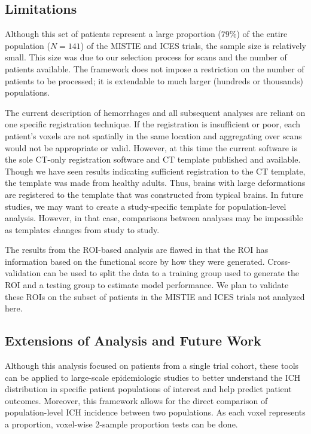 \documentclass[10pt]{article}\usepackage[]{graphicx}\usepackage[]{color}
\begin{document}
\subsection*{Limitations}

Although this set of patients represent a large proportion ($79$\%) of the entire population ($N=141$) of the MISTIE and ICES trials, the sample size is relatively small.  This size was due to our selection process for scans and the number of patients available.  The framework does not impose a restriction on the number of patients to be processed; it is extendable to much larger (hundreds or thousands) populations.

The current description of hemorrhages and all subsequent analyses are reliant on one specific registration technique.  If the registration is insufficient or poor, each patient's voxels are not spatially in the same location and aggregating over scans would not be appropriate or valid.  However, at this time the current software is the sole CT-only registration software and CT template published and available.  Though we have seen results indicating sufficient registration to the CT template, the template was made from healthy adults.  Thus, brains with large deformations are registered to the template that was constructed from typical brains. In future studies, we may want to create a study-specific template for population-level analysis.  However, in that case, comparisons between analyses may be impossible as templates changes from study to study. 

The results from the ROI-based analysis are flawed in that the ROI has information based on the functional score by how they were generated.  Cross-validation can be used to split the data to a training group used to generate the ROI and a testing group to estimate model performance.  We plan to validate these ROIs on the subset of patients in the MISTIE and ICES trials not analyzed here.  

\subsection*{Extensions of Analysis and Future Work }
Although this analysis focused on patients from a single trial cohort, these tools can be applied to large-scale epidemiologic studies to better understand the ICH distribution in specific patient populations of interest and help predict patient outcomes.  Moreover, this framework allows for the direct comparison of population-level ICH incidence between two populations.  As each voxel represents a proportion, voxel-wise 2-sample proportion tests can be done.
\end{document}
